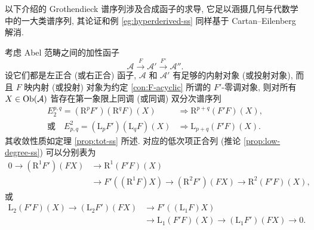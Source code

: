 以下介绍的 Grothendieck 谱序列涉及合成函子的求导, 它足以涵摄几何与代数学中的一大类谱序列, 其论证和例 \ref{eg:hyperderived-ss} 同样基于 Cartan--Eilenberg 解消.

\begin{theorem}\label{prop:Grothendieck-ss}
	考虑 Abel 范畴之间的加性函子
	\[ \mathcal{A} \xrightarrow{F} \mathcal{A}' \xrightarrow{F'} \mathcal{A}''. \]
	设它们都是左正合 (或右正合) 函子, $\mathcal{A}$ 和 $\mathcal{A}'$ 有足够的内射对象 (或投射对象), 而且 $F$ 映内射 (或投射) 对象为约定 \ref{con:F-acyclic} 所谓的 $F'$-零调对象, 则对所有 $X \in \operatorname{Ob}(\mathcal{A})$ 皆存在第一象限上同调 (或同调) 双分次谱序列
	\begin{align*}
		E_2^{p,q} = (\mathrm{R}^p F') (\mathrm{R}^q F)(X) & \Rightarrow \mathrm{R}^{p+q} (F'F)(X), \\
		\text{或} \quad E^2_{p,q} = (\mathrm{L}_p F') (\mathrm{L}_q F)(X) & \Rightarrow \mathrm{L}_{p+q}(F'F)(X).
	\end{align*}
	其收敛性质如定理 \ref{prop:tot-ss} 所述. 对应的低次项正合列 (推论 \ref{prop:low-degree-ss}) 可以分别表为
	\begin{equation*}\begin{split}
		0 \to (\mathrm{R}^1 F')(FX) & \to \mathrm{R}^1(F'F)(X) \\
		& \to F'\left( (\mathrm{R}^1 F)X \right) \to (\mathrm{R}^2 F')(FX) \to \mathrm{R}^2(F'F)(X),
	\end{split}\end{equation*}
	或
	\begin{equation*}\begin{split}
		\mathrm{L}_2(F'F)(X) \to (\mathrm{L}_2 F')(FX) & \to F'\left( (\mathrm{L}_1 F)X \right) \\
		& \to \mathrm{L}_1(F'F)(X) \to (\mathrm{L}_1 F')(FX) \to 0.
	\end{split}\end{equation*}
\end{theorem}
